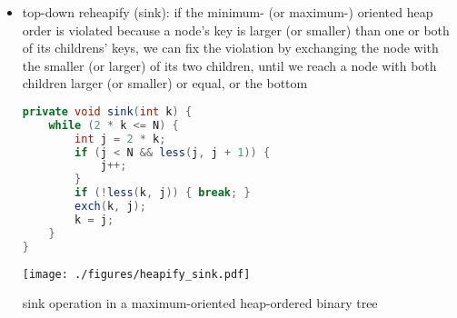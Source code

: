 \documentclass[8pt,a4paper,compress]{beamer}
\begin{document}
\begin{frame}[fragile]
\begin{itemize}
\item top-down reheapify (sink): if the minimum- (or maximum-) oriented heap order is violated because a node's key is larger (or smaller) than one or both of its childrens' keys, we can fix the violation by exchanging the node with the smaller (or larger) of its two children, until we reach a node with both children
larger (or smaller) or equal, or the bottom 

\bigskip

\begin{minipage}{150pt}
\begin{lstlisting}[language=Java]
private void sink(int k) {
    while (2 * k <= N) {
        int j = 2 * k;
        if (j < N && less(j, j + 1)) { 
            j++; 
        }
        if (!less(k, j)) { break; }
        exch(k, j);
        k = j;
    }
}
\end{lstlisting}
\end{minipage}%
\begin{minipage}{130pt}
\hfill \texttt{[image: ./figures/heapify\_sink.pdf]}
\end{minipage}

\smallskip

\begin{center}
sink operation in a maximum-oriented heap-ordered binary tree
\end{center}
\end{itemize}
\end{frame}
\end{document}
